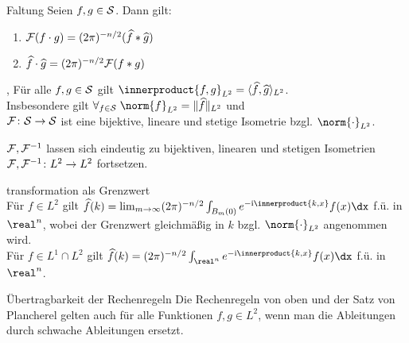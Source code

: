 \begin{Satz}{Faltung}
    Seien $f, g \in \S$.
    Dann gilt:
    \begin{enumerate}
        \item
        $\F(f \cdot g) = (2\pi)^{-n/2} (\widehat{f} \ast \widehat{g})$

        \item
        $\widehat{f} \cdot \widehat{g} = (2\pi)^{-n/2} \F(f \ast g)$
    \end{enumerate}
\end{Satz}

\linie

\begin{Satz}{, }
    Für alle $f, g \in \S$ gilt $\innerproduct{f, g}_{L^2} =
    \langle\widehat{f}, \widehat{g}\rangle_{L^2}$.\\
    Insbesondere gilt $\forall_{f \in \S}\; \norm{f}_{L^2} = \Vert\widehat{f}\Vert_{L^2}$ und\\
    $\F\colon \S \rightarrow \S$ ist eine bijektive, lineare und stetige Isometrie
    bzgl. $\norm{\cdot}_{L^2}$.
\end{Satz}

\begin{Kor}
    $\F, \F^{-1}$ lassen sich eindeutig zu bijektiven, linearen und stetigen Isometrien\\
    $\F, \F^{-1}\colon L^2 \rightarrow L^2$ fortsetzen.
\end{Kor}

\linie
\pagebreak

\begin{Satz}{transformation als Grenzwert}\\
    Für $f \in L^2$ gilt
    $\widehat{f}(k) = \lim_{m \to \infty} (2\pi)^{-n/2} \int_{B_m(0)} e^{-\iu\innerproduct{k,x}}f(x)\dx$
    f.ü. in $\real^n$, wobei der Grenzwert gleichmäßig in $k$ bzgl. $\norm{\cdot}_{L^2}$
    angenommen wird.\\
    Für $f \in L^1 \cap L^2$ gilt
    $\widehat{f}(k) = (2\pi)^{-n/2} \int_{\real^n} e^{-\iu\innerproduct{k,x}}f(x)\dx$ f.ü. in $\real^n$.
\end{Satz}

\begin{Satz}{Übertragbarkeit der Rechenregeln}
    Die Rechenregeln von oben und der Satz von Plancherel gelten auch für alle Funktionen
    $f, g \in L^2$, wenn man die Ableitungen durch schwache Ableitungen ersetzt.
\end{Satz}

